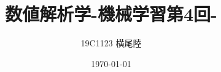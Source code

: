 \documentclass[dvipdfmx]{jsarticle}
\begin{document}
\title{数値解析学-機械学習第4回-}
\author{19C1123 横尾陸}
\date{\today}
\maketitle
\end{document}
